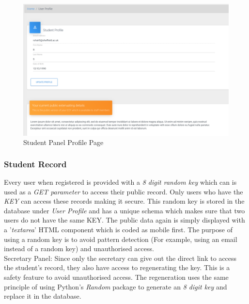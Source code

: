 \documentclass[../main.tex]{subfiles}
\begin{document}
\begin{figure}[H]
        \includegraphics[scale=0.7]
        {images/profile.png}
        \caption{\label{fig:profile} Student Panel Profile Page}
      \end{figure}

\subsubsection{Student Record} 
Every user when registered is provided with a\textit{ 8 digit random key} which can is used as a \textit{GET parameter} to access their public record. Only users who have the \textit{KEY} can access these records making it secure. This random key is stored in the database under \textit{User Profile} and has a unique schema which makes sure that two users do not have the same KEY. The public data again is simply displayed with a '\textit{textarea}' HTML component which is coded as mobile first. The purpose of using a random key is to avoid pattern detection (For example, using an email instead of a random key) and unauthorised access.  \\[4mm]

Secretary Panel: Since only the secretary can give out the direct link to access the student's record, they also have access to regenerating the key. This is a safety feature to avoid unauthorised access. The regeneration uses the same principle of using Python's \textit{Random} package to generate an \textit{8 digit key} and replace it in the database. 
\end{document}
